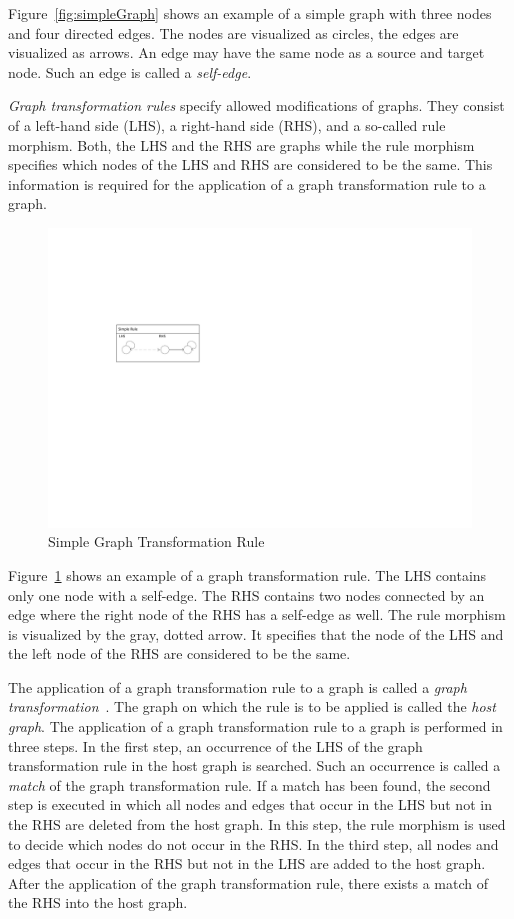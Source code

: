 Figure~\ref{fig:simpleGraph} shows an example of a simple graph with three nodes and four directed edges. The nodes are visualized as circles, the edges are visualized as arrows. An edge may have the same node as a source and target node. Such an edge is called a \emph{self-edge}. 

\emph{Graph transformation rules} specify allowed modifications of graphs. They consist of a left-hand side (LHS), a right-hand side (RHS), and a so-called rule morphism. Both, the LHS and the RHS are graphs while the rule morphism specifies which nodes of the LHS and RHS are considered to be the same. This information is required for the application of a graph transformation rule to a graph.

\begin{figure}[htbp]
  \centering
  \includegraphics[scale=1.5]{figures/SimpleGTRule}
  \caption{Simple Graph Transformation Rule}
  \label{fig:simpleGTRule}
\end{figure}

Figure~\ref{fig:simpleGTRule} shows an example of a graph transformation rule. The LHS contains only one node with a self-edge. The RHS contains two nodes connected by an edge where the right node of the RHS has a self-edge as well. The rule morphism is visualized by the gray, dotted arrow. It specifies that the node of the LHS and the left node of the RHS are considered to be the same.

The application of a graph transformation rule to a graph is called a \emph{graph transformation}~\cite{EEPT06}. The graph on which the rule is to be applied is called the \emph{host graph}.
The application of a graph transformation rule to a graph is performed in three steps. In the first step, an occurrence of the LHS of the graph transformation rule in the host graph is searched. Such an occurrence is called a \emph{match} of the graph transformation rule. If a match has been found, the second step is executed in which all nodes and edges that occur in the LHS but not in the RHS are deleted from the host graph. In this step, the rule morphism is used to decide which nodes do not occur in the RHS. In the third step, all nodes and edges that occur in the RHS but not in the LHS are added to the host graph. After the application of the graph transformation rule, there exists a match of the RHS into the host graph.

